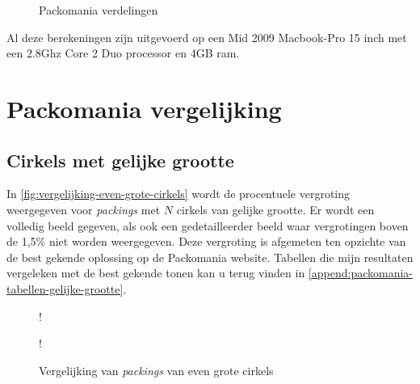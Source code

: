 \documentclass[12pt,a4paper,oneside]{book}
\begin{document}
{\begin {figure}
{
	}
	\caption{Packomania verdelingen}
	\label{fig:packomania-verdelingen}
\end {figure}

Al deze berekeningen zijn uitgevoerd op een Mid 2009 Macbook-Pro 15 inch met een 2.8Ghz Core 2 Duo processor en 4GB ram.

\section{Packomania vergelijking}

\subsection{Cirkels met gelijke grootte}

In \autoref{fig:vergelijking-even-grote-cirkels} wordt de procentuele vergroting weergegeven voor \textit{packings} met $N$ cirkels van gelijke grootte.
Er wordt een volledig beeld gegeven, als ook een gedetailleerder beeld waar vergrotingen boven de 1,5\% niet worden weergegeven.
Deze vergroting is afgemeten ten opzichte van de best gekende oplossing op de Packomania website.
Tabellen die mijn resultaten vergeleken met de best gekende tonen kan u terug vinden in \autoref{append:packomania-tabellen-gelijke-grootte}.

\begin {figure}
	\centering
	 {!} {
	}
	 {!} {
	}
	\caption{Vergelijking van \textit{packings} van even grote cirkels}
	\label{fig:vergelijking-even-grote-cirkels}
\end {figure}

}
\end{document}
